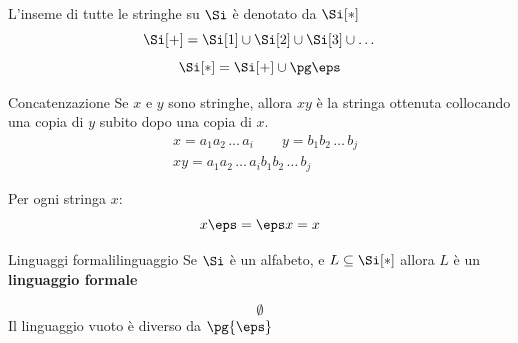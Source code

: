 \begin{note}
    L'inseme di tutte le stringhe su $\Si$ è denotato da $\Si[*]$
    \[
        \Si[+] = \Si[1] \cup\Si[2] \cup  \Si[3] \cup\dots
    \]
    \[
        \Si[*] = \Si[+] \cup \pg \eps
    \]
\end{note}
\begin{definition}{Concatenzazione}{}
    Se $x$ e $y$ sono stringhe, allora $xy$ è la stringa ottenuta collocando una copia di $y$ subito dopo una copia di $x$.
    \[
        \begin{aligned}
            &x = a_1a_2\,\dots\,a_i \qquad y = b_1b_2\,\dots\,b_j \\
            &xy = a_1a_2\,\dots\,a_ib_1b_2\,\dots\,b_j
        \end{aligned}
    \]
    \begin{note}
        Per ogni stringa $x$:
        \[
            x\eps = \eps x = x
        \]
    \end{note}
\end{definition}
\begin{definition}{Linguaggi formali}{linguaggio}
    Se $\Si$ è un alfabeto, e $L \subseteq \Si[*]$ allora $L$ è un \textbf{linguaggio formale}
    \begin{note}
        \[
            \emptyset
        \]
        Il linguaggio vuoto è diverso da $\pg{\eps}$
    \end{note}
\end{definition}
%
